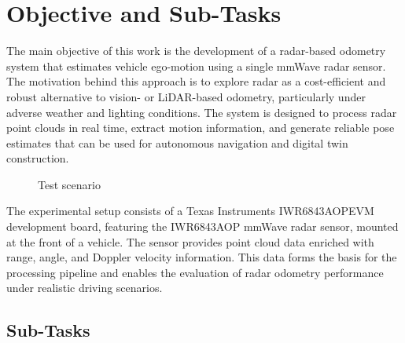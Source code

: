 \section{Objective and Sub-Tasks}
\label{sec:objective}
The main objective of this work is the development of a radar-based odometry system that estimates vehicle ego-motion using a single mmWave radar sensor.  
The motivation behind this approach is to explore radar as a cost-efficient and robust alternative to vision- or LiDAR-based odometry, particularly under adverse weather and lighting conditions.  
The system is designed to process radar point clouds in real time, extract motion information, and generate reliable pose estimates that can be used for autonomous navigation and digital twin construction.  

\begin{figure}[!htbp]
    \centering
    \caption{Test scenario}
    \label{fig:test_scenario}
\end{figure}
The experimental setup consists of a Texas Instruments IWR6843AOPEVM development board, featuring the IWR6843AOP mmWave radar sensor, mounted at the front of a vehicle.  
The sensor provides point cloud data enriched with range, angle, and Doppler velocity information.  
This data forms the basis for the processing pipeline and enables the evaluation of radar odometry performance under realistic driving scenarios.  


\subsection{Sub-Tasks}


